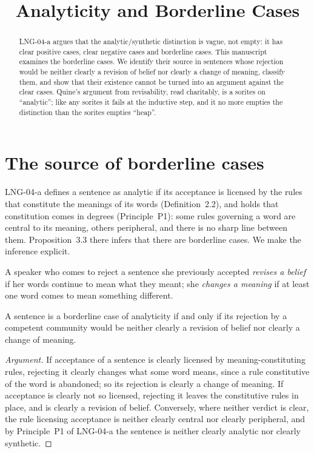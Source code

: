 \documentclass{situationist-preprint}
\title{Analyticity and Borderline Cases}
\begin{document}
\maketitle

\begin{abstract}
LNG-04-a argues that the analytic/synthetic distinction is vague, not empty: it has clear positive cases, clear negative cases and borderline cases. This manuscript examines the borderline cases. We identify their source in sentences whose rejection would be neither clearly a revision of belief nor clearly a change of meaning, classify them, and show that their existence cannot be turned into an argument against the clear cases. Quine's argument from revisability, read charitably, is a sorites on \enquote{analytic}; like any sorites it fails at the inductive step, and it no more empties the distinction than the sorites empties \enquote{heap}.
\end{abstract}

\section{The source of borderline cases}

LNG-04-a defines a sentence as analytic if its acceptance is licensed by the rules that constitute the meanings of its words (Definition~2.2), and holds that constitution comes in degrees (Principle~P1): some rules governing a word are central to its meaning, others peripheral, and there is no sharp line between them. Proposition~3.3 there infers that there are borderline cases. We make the inference explicit.

\begin{definition}\label{d:revmean}
A speaker who comes to reject a sentence she previously accepted \emph{revises a belief} if her words continue to mean what they meant; she \emph{changes a meaning} if at least one word comes to mean something different.
\end{definition}

\begin{proposition}\label{p:source}
A sentence is a borderline case of analyticity if and only if its rejection by a competent community would be neither clearly a revision of belief nor clearly a change of meaning.
\end{proposition}

\begin{proof}[Argument]
If acceptance of a sentence is clearly licensed by meaning-constituting rules, rejecting it clearly changes what some word means, since a rule constitutive of the word is abandoned; so its rejection is clearly a change of meaning. If acceptance is clearly not so licensed, rejecting it leaves the constitutive rules in place, and is clearly a revision of belief. Conversely, where neither verdict is clear, the rule licensing acceptance is neither clearly central nor clearly peripheral, and by Principle~P1 of LNG-04-a the sentence is neither clearly analytic nor clearly synthetic.
\end{proof}
\end{document}
